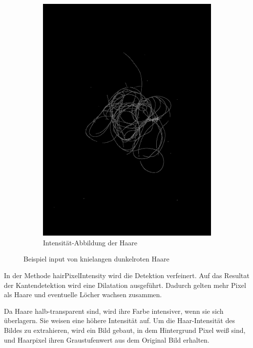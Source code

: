 \documentclass[german,a4paper, 12pt]{llncs}
\begin{document}
\begin{figure}
\begin{subfigure}[b]{0.475\textwidth}
		\includegraphics[width=\textwidth]{fig64/05intenstiy.png}
		\caption[]{Intensität-Abbildung der Haare}
		\label{img:Intensity}
	\end{subfigure}
	\caption[  ]
	{\small Beispiel input von knielangen dunkelroten Haare} 
	\label{img:cannywrap}
\end{figure}


In der Methode hairPixelIntensity wird die Detektion verfeinert.
Auf das Resultat der Kantendetektion wird eine Dilatation ausgeführt. Dadurch gelten mehr Pixel als Haare und eventuelle Löcher wachsen zusammen.

Da Haare halb-transparent sind, wird ihre Farbe intensiver, wenn sie sich überlagern. Sie weisen eine höhere Intensität auf.
Um die Haar-Intensität des Bildes zu extrahieren, wird ein Bild gebaut, in dem Hintergrund Pixel weiß sind, und Haarpixel ihren Graustufenwert aus dem Original Bild erhalten.
\end{document}
